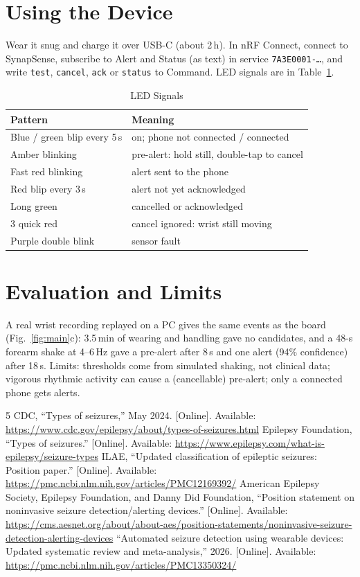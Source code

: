 \documentclass[conference,letterpaper,9pt]{IEEEtran}
\begin{document}
\section{Using the Device}
Wear it snug and charge it over USB-C (about 2\,h). In nRF Connect, connect to \textsf{SynapSense}, subscribe to
Alert and Status (as text) in service \texttt{7A3E0001-\ldots}, and write \texttt{test}, \texttt{cancel},
\texttt{ack} or \texttt{status} to Command. LED signals are in Table~\ref{tab:led}.

\begin{table}[t]
\caption{LED Signals}
\label{tab:led}
\centering
\footnotesize
\begin{tabular}{@{}p{}p{}@{}}
\hline
\textbf{Pattern} & \textbf{Meaning}\\
\hline
Blue / green blip every 5\,s & on; phone not connected / connected\\
Amber blinking & pre-alert: hold still, double-tap to cancel\\
Fast red blinking & alert sent to the phone\\
Red blip every 3\,s & alert not yet acknowledged\\
Long green & cancelled or acknowledged\\
3 quick red & cancel ignored: wrist still moving\\
Purple double blink & sensor fault\\
\hline
\end{tabular}
\end{table}

\section{Evaluation and Limits}
A real wrist recording replayed on a PC gives the same events as the board (Fig.~\ref{fig:main}c): 3.5\,min of
wearing and handling gave no candidates, and a 48-s forearm shake at 4--6\,Hz gave a pre-alert after 8\,s and one
alert (94\% confidence) after 18\,s. Limits:
thresholds come from simulated shaking, not clinical data; vigorous rhythmic activity can cause a (cancellable)
pre-alert; only a connected phone gets alerts.

\begin{thebibliography}{5}
 CDC, ``Types of seizures,'' May 2024. [Online].
Available: \url{https://www.cdc.gov/epilepsy/about/types-of-seizures.html}
 Epilepsy Foundation, ``Types of seizures.'' [Online]. Available:
\url{https://www.epilepsy.com/what-is-epilepsy/seizure-types}
 ILAE, ``Updated classification of epileptic seizures:
Position paper.'' [Online]. Available: \url{https://pmc.ncbi.nlm.nih.gov/articles/PMC12169392/}
 American Epilepsy Society, Epilepsy Foundation, and Danny Did Foundation, ``Position statement
on noninvasive seizure detection/alerting devices.'' [Online]. Available:
\url{https://cms.aesnet.org/about/about-aes/position-statements/noninvasive-seizure-detection-alerting-devices}
 ``Automated seizure detection using wearable devices: Updated systematic review and
meta-analysis,'' 2026. [Online]. Available: \url{https://pmc.ncbi.nlm.nih.gov/articles/PMC13350324/}
\end{thebibliography}
\end{document}

